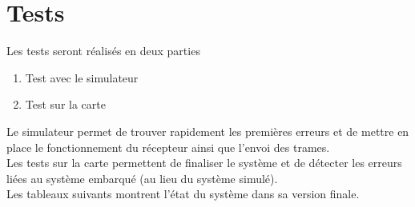 \documentclass[DeseNET_Sebastien_Deriaz]{subfiles}
\begin{document}
\section{Tests}
Les tests seront réalisés en deux parties
\begin{enumerate}
\item Test avec le simulateur
\item Test sur la carte
\end{enumerate}
Le simulateur permet de trouver rapidement les premières erreurs et de mettre en place le fonctionnement du récepteur ainsi que l'envoi des trames.\\
Les tests sur la carte permettent de finaliser le système et de détecter les erreurs liées au système embarqué (au lieu du système simulé).\\
Les tableaux suivants montrent l'état du système dans sa version finale.
\renewcommand{\arraystretch}{1.3}
\end{document}
